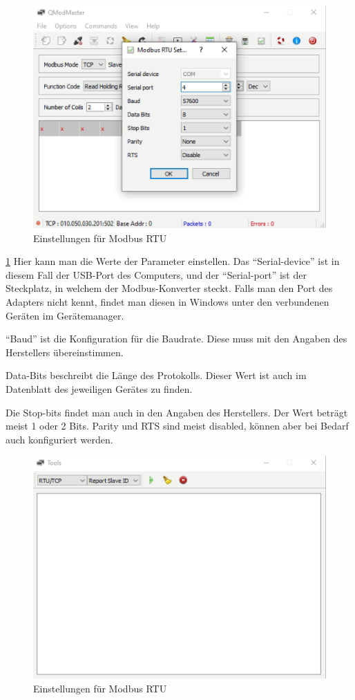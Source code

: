 \begin{figure}[h t] 
    \centering
    \includegraphics[scale=0.7]{pics/Settingsforqmodmaster.png}
    \caption{Einstellungen für Modbus RTU}
    \label{fig:impl:Settingsforqmodmaster}
\end{figure}


\ref{fig:impl:Settingsforqmodmaster} Hier kann man die Werte der Parameter einstellen. Das “Serial-device” ist in diesem Fall der USB-Port des Computers, und der “Serial-port” ist der Steckplatz, in welchem der Modbus-Konverter steckt. Falls man den Port des Adapters nicht kennt, findet man diesen in Windows unter den verbundenen Geräten im Gerätemanager.  

“Baud” ist die Konfiguration für die Baudrate. Diese muss mit den Angaben des Herstellers übereinstimmen.  

Data-Bits beschreibt die Länge des Protokolls. Dieser Wert ist auch im Datenblatt des jeweiligen Gerätes zu finden.  

Die Stop-bits findet man auch in den Angaben des Herstellers. Der Wert beträgt meist 1 oder 2 Bits. Parity und RTS sind meist disabled, können aber bei Bedarf auch konfiguriert werden.  

\begin{figure}[h t] 
    \centering
    \includegraphics[scale=0.7]{pics/ToolsQModbusMaster.png}
    \caption{Einstellungen für Modbus RTU}
    \label{fig:impl:ToolsQModbusMaster}
\end{figure}

